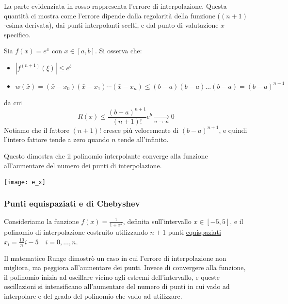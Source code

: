 \documentclass{article}
\begin{document}
La parte evidenziata in {\color{red}rosso} rappresenta l'errore di interpolazione. Questa
quantità ci mostra come l'errore dipende dalla regolarità della funzione
($(n+1)$-esima derivata), dai punti interpolanti scelti, e dal punto di
valutazione $\bar{x}$ specifico.
\begin{example}
    Sia $f(x)=e^x$ con $x\in[a,b]$. Si osserva che:
    \begin{itemize}
        \item $\left\lvert f^{(n+1)}(\xi)\right\rvert\leq e^b$
        \item $w(\bar{x})=(\bar{x}-x_0)(\bar{x}-x_1)\cdots(\bar{x}-x_n)\leq(b-a)(b-a)\ldots(b-a)=(b-a)^{n+1}$
    \end{itemize}
    da cui 
    $$R(x)\leq
    \frac{(b-a)^{n+1}}{(n+1)!}e^{b}\underset{n\rightarrow\infty}{\to}0$$
    Notiamo che il fattore $(n+1)!$ cresce più velocemente di $(b-a)^{n+1}$, e
    quindi l'intero fattore tende a zero quando $n$ tende all'infinito.

    Questo dimostra che il polinomio interpolante converge alla funzione
    all'aumentare del numero dei punti di interpolazione.
    \begin{center}
        \texttt{[image: e\_x]}
    \end{center}
\end{example}
\subsubsection{Punti equispaziati e di Chebyshev} Consideriamo la funzione
$f(x)=\frac{1}{1+x^2}$, definita sull'intervallo $x\in[-5,5]$, 
e il polinomio di interpolazione costruito utilizzando $n+1$ punti
\underline{equispaziati} $x_i=\frac{10}{n}i-5\quad i=0,\ldots,n$. 

Il matematico Runge dimostrò un caso in cui l'errore di interpolazione non
migliora, ma peggiora all'aumentare dei punti. Invece di convergere alla
funzione, il polinomio inizia ad oscillare vicino agli estremi
dell'intervallo, e queste oscillazioni si intensificano all'aumentare del numero di
punti in cui vado ad interpolare e del grado del polinomio che vado ad
utilizzare.
\end{document}
